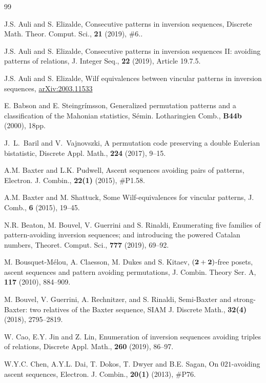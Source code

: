 \documentclass[12pt,A4]{amsart}
\numberwithin{equation}{section}
\theoremstyle{plain}
\theoremstyle{definition}
\begin{document}
\begin{thebibliography}{99}


 J.S. Auli and S. Elizalde, Consecutive patterns in inversion sequences, Discrete Math. Theor. Comput. Sci., {\bf21} (2019),  $\#6$..

J.S. Auli and S. Elizalde, Consecutive patterns in inversion sequences II: avoiding patterns of relations,  J. Integer Seq., {\bf22} (2019), Article 19.7.5. 

J.S. Auli and S. Elizalde, Wilf equivalences between vincular patterns in inversion sequences, \href{https://arxiv.org/abs/2003.11533}{arXiv:2003.11533}

 E. Babson and E. Steingr\'imsson, Generalized permutation patterns and a classification of the Mahonian statistics, S\'emin. Lotharingien Comb., {\bf B44b} (2000), 18pp.

 J.~L.~Baril and V.~Vajnovszki, A permutation code preserving a double Eulerian bistatistic, Discrete Appl. Math., {\bf 224} (2017), 9--15.

 A.M. Baxter and L.K. Pudwell, Ascent sequences avoiding pairs of patterns,  Electron. J. Combin., {\bf 22(1)} (2015), \#P1.58.


 A.M. Baxter and M. Shattuck, Some Wilf-equivalences for vincular patterns, J. Comb., {\bf6} (2015), 19--45.

 N.R. Beaton, M. Bouvel, V. Guerrini and S. Rinaldi, Enumerating five families of pattern-avoiding inversion sequences; and introducing the powered Catalan numbers, Theoret. Comput. Sci., {\bf777} (2019), 69--92.

M. Bousquet-M\'elou, A. Claesson, M. Dukes and S. Kitaev,
$({\bf2+2})$-free posets, ascent sequences and pattern avoiding permutations,
J. Combin. Theory Ser. A, {\bf117} (2010), 884--909.

 M. Bouvel, V. Guerrini, A. Rechnitzer, and S. Rinaldi, Semi-Baxter and strong-Baxter: two relatives of the Baxter sequence,  SIAM J. Discrete Math., {\bf 32(4)} (2018), 2795--2819.

 W. Cao, E.Y. Jin and Z. Lin, Enumeration of inversion sequences avoiding triples of relations, Discrete Appl. Math., {\bf260} (2019), 86--97.

 W.Y.C. Chen, A.Y.L. Dai, T. Dokos, T. Dwyer and B.E. Sagan, On $021$-avoiding ascent sequences,  Electron. J. Combin., {\bf 20(1)} (2013), \#P76.


\end{thebibliography}
\end{document}
